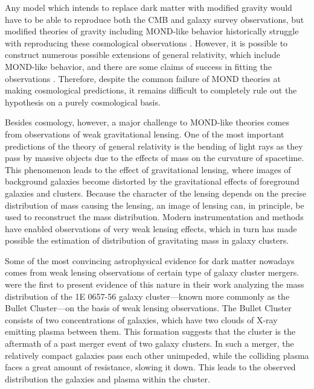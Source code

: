 Any model which intends to replace dark matter with modified gravity would have to be able to reproduce both the CMB and galaxy survey observations, but modified theories of gravity including MOND-like behavior historically struggle with reproducing these cosmological observations \parencites{XuWangZhang2015, TanWoodard2018, ZlosnikSkordis2017}. However, it is possible to construct numerous possible extensions of general relativity, which include MOND-like behavior, and there are some claims of success in fitting the observations \parencite{SkordisZlosnik2021}. Therefore, despite the common failure of MOND theories at making cosmological predictions, it remains difficult to completely rule out the hypothesis on a purely cosmological basis.

Besides cosmology, however, a major challenge to MOND-like theories comes from observations of weak gravitational lensing. One of the most important predictions of the theory of general relativity is the bending of light rays as they pass by massive objects due to the effects of mass on the curvature of spacetime. This phenomenon leads to the effect of gravitational lensing, where images of background galaxies become distorted by the gravitational effects of foreground galaxies and clusters. Because the character of the lensing depends on the precise distribution of mass causing the lensing, an image of lensing can, in principle, be used to reconstruct the mass distribution. Modern instrumentation and methods have enabled observations of very weak lensing effects, which in turn has made possible the estimation of distribution of gravitating mass in galaxy clusters.

Some of the most convincing astrophysical evidence for dark matter nowadays comes from weak lensing observations of certain type of galaxy cluster mergers. \textcite{CloweEtAl2006} were the first to present evidence of this nature in their work analyzing the mass distribution of the 1E 0657-56 galaxy cluster---known more commonly as the Bullet Cluster---on the basis of weak lensing observations. The Bullet Cluster consists of two concentrations of galaxies, which have two clouds of X-ray emitting plasma between them. This formation suggests that the cluster is the aftermath of a past merger event of two galaxy clusters. In such a merger, the relatively compact galaxies pass each other unimpeded, while the colliding plasma faces a great amount of resistance, slowing it down. This leads to the observed distribution the galaxies and plasma within the cluster.

